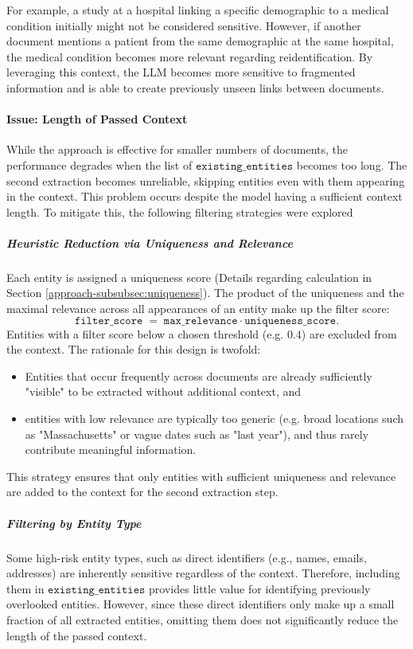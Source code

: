 For example, a study at a hospital linking a specific demographic to a medical condition initially might not be considered sensitive. However, if another document mentions a patient from the same demographic at the same hospital, the medical condition becomes more relevant regarding reidentification. By leveraging this context, the LLM becomes more sensitive to fragmented information and is able to create previously unseen links between documents. %


\paragraph{Issue: Length of Passed Context}
While the approach is effective for smaller numbers of documents, the performance degrades when the list of $\texttt{existing\_entities}$ becomes too long. The second extraction becomes unreliable, skipping entities even with them appearing in the context. This problem occurs despite the model having a sufficient context length. To mitigate this, the following filtering strategies were explored %

\subparagraph{Heuristic Reduction via Uniqueness and Relevance}
Each entity is assigned a uniqueness score (Details regarding calculation in Section \ref{approach-subsubsec:uniqueness}). The product of the uniqueness and the maximal relevance across all appearances of an entity make up the filter score:
\[
    \texttt{filter\_score} \;=\; \texttt{max\_relevance} \cdot \texttt{uniqueness\_score}.
\]
Entities with a filter score below a chosen threshold (e.g. $0.4$) are excluded from the context. The rationale for this design is twofold:
\begin{itemize}
    \item Entities that occur frequently across documents are already sufficiently "visible" to be extracted without additional context, and
    \item entities with low relevance are typically too generic (e.g. broad locations such as "Massachusetts" or vague dates such as "last year"), and thus rarely contribute meaningful information.
\end{itemize}
This strategy ensures that only entities with sufficient uniqueness and relevance are added to the context for the second extraction step. %


\subparagraph{Filtering by Entity Type}\label{approach-subpar:type_filtering}
Some high-risk entity types, such as direct identifiers (e.g., names, emails, addresses) are inherently sensitive regardless of the context. Therefore, including them in $\texttt{existing\_entities}$ provides little value for identifying previously overlooked entities. However, since these direct identifiers only make up a small fraction of all extracted entities, omitting them does not significantly reduce the length of the passed context.

